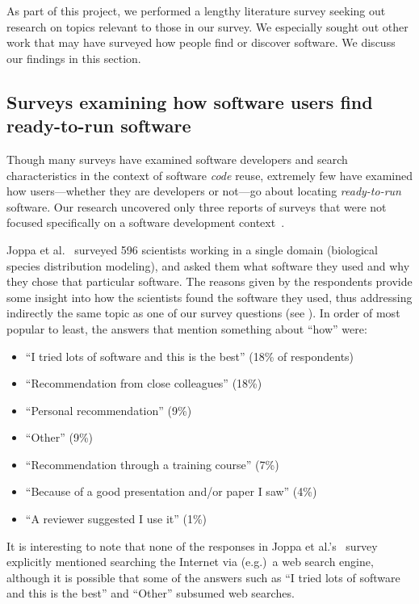 \documentclass{casicswhitepaper}
\begin{document}
As part of this project, we performed a lengthy literature survey seeking out research on topics relevant to those in our survey.  We especially sought out other work that may have surveyed how people find or discover software.  We discuss our findings in this section.


\subsection{Surveys examining how software users find ready-to-run software}

Though many surveys have examined software developers and search characteristics in the context of software \emph{code} reuse, extremely few have examined how users---whether they are developers or not---go about locating \emph{ready-to-run} software.  Our research uncovered only three reports of surveys that were not focused specifically on a software development context~\cite{joppa2013troubling, huang2013provenance, lawrence2015science}.

Joppa et al.~\cite{joppa2013troubling} surveyed 596 scientists working in a single domain (biological species distribution modeling), and asked them what software they used and why they chose that particular software.  The reasons given by the respondents provide some insight into how the scientists found the software they used, thus addressing indirectly the same topic as one of our survey questions (see ).  In order of most popular to least, the answers that mention something about ``how'' were:

\begin{itemize}[itemsep=-0.5ex]

\item ``I tried lots of software and this is the best'' (18\% of respondents)
\item ``Recommendation from close colleagues'' (18\%)
\item ``Personal recommendation'' (9\%)
\item ``Other'' (9\%)
\item ``Recommendation through a training course'' (7\%)
\item ``Because of a good presentation and/or paper I saw'' (4\%)
\item ``A reviewer suggested I use it'' (1\%)

\end{itemize}

It is interesting to note that none of the responses in Joppa et al.'s~\cite{joppa2013troubling} survey explicitly mentioned searching the Internet via (e.g.)\ a web search engine, although it is possible that some of the answers such as ``I tried lots of software and this is the best'' and ``Other'' subsumed web searches.
\end{document}
